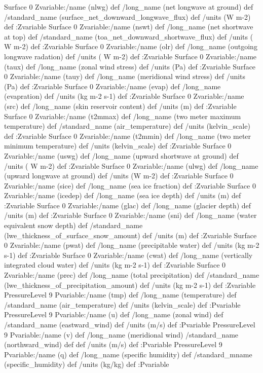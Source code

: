 \begin{ingrid}
Surface 0 Zvariable:/name (nlwg) def /long_name (net longwave at ground) def /standard_name (surface_net_downward_longwave_flux) def /units (W m-2) def :Zvariable
Surface 0 Zvariable:/name (nswt) def /long_name (net shortwave at top) def /standard_name (toa_net_downward_shortwave_flux) def /units ( W m-2) def :Zvariable
Surface 0 Zvariable:/name (olr) def /long_name (outgoing longwave radation) def /units ( W m-2) def :Zvariable
Surface 0 Zvariable:/name (taux) def /long_name (zonal wind stress) def /units (Pa) def :Zvariable
Surface 0 Zvariable:/name (tauy) def /long_name (meridional wind stress) def /units (Pa) def :Zvariable
Surface 0 Zvariable:/name (evap) def /long_name (evapration) def /units (kg m-2 s-1) def :Zvariable
Surface 0 Zvariable:/name (src) def /long_name (skin reservoir content) def /units (m) def :Zvariable
Surface 0 Zvariable:/name (t2mmax) def /long_name (two meter maximum temperature) def /standard_name (air_temperature) def /units (kelvin_scale) def :Zvariable
Surface 0 Zvariable:/name (t2mmin) def /long_name (two meter minimum temperature) def /units (kelvin_scale) def :Zvariable
Surface 0 Zvariable:/name (uswg) def /long_name (upward shortwave at ground) def /units ( W m-2) def :Zvariable
Surface 0 Zvariable:/name (ulwg) def /long_name (upward longwave at ground) def /units (W m-2) def :Zvariable
Surface 0 Zvariable:/name (sice) def /long_name (sea ice fraction) def :Zvariable
Surface 0 Zvariable:/name (icedep) def /long_name (sea ice depth) def /units (m) def :Zvariable
Surface 0 Zvariable:/name (glac) def /long_name (glacier depth) def /units (m) def :Zvariable
Surface 0 Zvariable:/name (sni) def /long_name (water equivalent snow depth) def  /standard_name (lwe_thickness_of_surface_snow_amount) def /units (m) def :Zvariable
Surface 0 Zvariable:/name (pwat) def /long_name (precipitable water) def /units (kg m-2 s-1) def :Zvariable
Surface 0 Zvariable:/name (cwat) def /long_name (vertically integrated cloud water) def /units (kg m-2 s-1) def :Zvariable
Surface 0 Zvariable:/name (prec) def /long_name (total precipitation) def /standard_name (lwe_thickness_of_precipitation_amount) def /units (kg m-2 s-1) def :Zvariable
PressureLevel 9 Pvariable:/name (tmp) def /long_name (temperature) def /standard_name (air_temperature) def /units (kelvin_scale) def :Pvariable
PressureLevel 9 Pvariable:/name (u) def /long_name (zonal wind) def /standard_name (eastward_wind) def /units (m/s) def :Pvariable
PressureLevel 9 Pvariable:/name (v) def /long_name (meridional wind) /standard_name (northward_wind) def def /units (m/s) def :Pvariable
PressureLevel 9 Pvariable:/name (q) def /long_name (specific humidity) def /standard_mname (specific_humidity) def /units (kg/kg) def :Pvariable

\end{ingrid}
